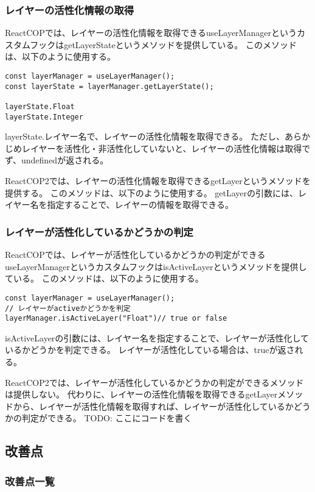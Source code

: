 \documentclass{jsarticle}
\begin{document}
\subsubsection{レイヤーの活性化情報の取得}
ReactCOPでは、レイヤーの活性化情報を取得できるuseLayerManagerというカスタムフックはgetLayerStateというメソッドを提供している。
このメソッドは、以下のように使用する。
\begin{lstlisting}[]
const layerManager = useLayerManager();
const layerState = layerManager.getLayerState();

layerState.Float
layerState.Integer
\end{lstlisting}
layerState.{レイヤー名}で、レイヤーの活性化情報を取得できる。
ただし、あらかじめレイヤーを活性化・非活性化していないと、レイヤーの活性化情報は取得でず、undefinedが返される。

ReactCOP2では、レイヤーの活性化情報を取得できるgetLayerというメソッドを提供する。%
このメソッドは、以下のように使用する。
getLayerの引数には、レイヤー名を指定することで、レイヤーの情報を取得できる。

\subsubsection{レイヤーが活性化しているかどうかの判定}
ReactCOPでは、レイヤーが活性化しているかどうかの判定ができるuseLayerManagerというカスタムフックはisActiveLayerというメソッドを提供している。
このメソッドは、以下のように使用する。
\begin{lstlisting}[]
const layerManager = useLayerManager();
// レイヤーがactiveかどうかを判定
layerManager.isActiveLayer("Float")// true or false
\end{lstlisting}
isActiveLayerの引数には、レイヤー名を指定することで、レイヤーが活性化しているかどうかを判定できる。
レイヤーが活性化している場合は、trueが返される。

ReactCOP2では、レイヤーが活性化しているかどうかの判定ができるメソッドは提供しない。
代わりに、レイヤーの活性化情報を取得できるgetLayerメソッドから、レイヤーが活性化情報を取得すれば、レイヤーが活性化しているかどうかの判定ができる。
TODO: ここにコードを書く

\subsection{改善点}


\subsubsection{改善点一覧}
\end{document}
